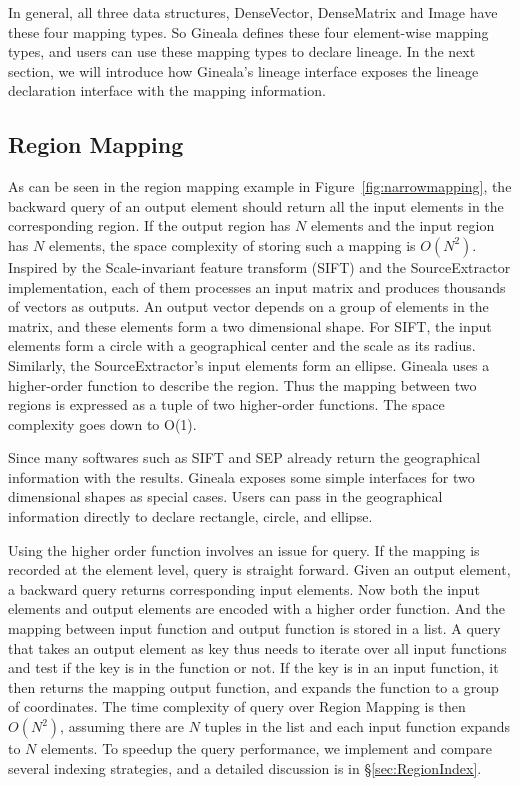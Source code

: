 \documentclass{sig-alternate}
\begin{document}
In general, all three data structures, DenseVector, DenseMatrix and Image have these four mapping types. 
So Gineala defines these four element-wise mapping types, and users can use these mapping types to declare lineage. 
In the next section, we will introduce how Gineala's lineage interface exposes the lineage declaration interface with the mapping information.


\subsection{Region Mapping}
\label{sec:Design-RegionMapping}
As can be seen in the region mapping example in Figure~\ref{fig:narrowmapping}, the backward query of an output element should return all the input elements in the corresponding region. If the output region has $N$ elements and the input region has $N$ elements, the space complexity of storing such a mapping is $O(N^2)$. 
Inspired by the Scale-invariant feature transform (SIFT) and the SourceExtractor implementation, each of them processes an input matrix and produces thousands of vectors as outputs. An output vector depends on a group of elements in the matrix, and these elements form a two dimensional shape. 
For SIFT, the input elements form a circle with a geographical center and the scale as its radius.
Similarly, the SourceExtractor's input elements  form an ellipse. 
Gineala uses a higher-order function to describe the region. 
Thus the mapping between two regions is expressed as a tuple of two higher-order functions.
The space complexity goes down to O(1).

Since many softwares such as SIFT and SEP already return the geographical information with the results.
Gineala exposes some simple interfaces for two dimensional shapes as special cases.
Users can pass in the geographical information directly to declare rectangle, circle, and ellipse.

Using the higher order function involves an issue for query. If the mapping is recorded at the element level, query is straight forward.
Given an output element, a backward query returns corresponding input elements.
Now both the input elements and output elements are encoded with a higher order function. 
And the mapping between input function and output function is stored in a list. 
A query that takes an output element as key thus needs to iterate over all input functions and test if the key is in the function or not.
If the key is in an input function, it then returns the mapping output function, and expands the function to a group of coordinates.
The time complexity of query over Region Mapping is then $O(N^2)$, assuming there are $N$ tuples in the list and each input function expands to $N$ elements.
To speedup the query performance, we implement and compare several indexing strategies, and a detailed discussion is in \S\ref{sec:RegionIndex}.
\end{document}
